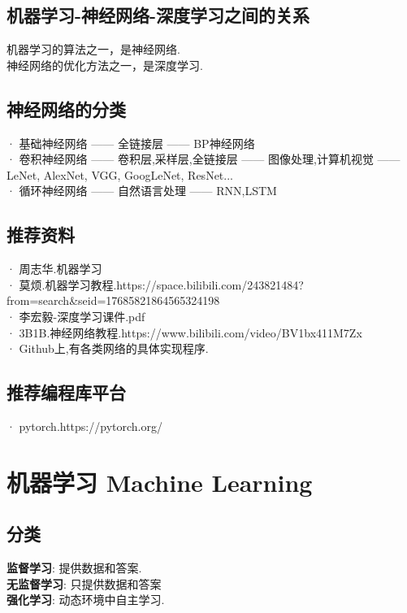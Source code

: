 \documentclass{article}
\begin{document}
\subsection{机器学习-神经网络-深度学习之间的关系}
机器学习的算法之一，是神经网络.\\
神经网络的优化方法之一，是深度学习.

\subsection{神经网络的分类}
· 基础神经网络 —— 全链接层 —— BP神经网络\\
· 卷积神经网络 —— 卷积层,采样层,全链接层 —— 图像处理,计算机视觉  —— LeNet, AlexNet, VGG, GoogLeNet, ResNet...\\
· 循环神经网络 —— 自然语言处理 —— RNN,LSTM\\

\subsection{推荐资料}
· 周志华.机器学习\\
· 莫烦.机器学习教程.https://space.bilibili.com/243821484?from=search&seid=17685821864565324198\\
· 李宏毅-深度学习课件.pdf\\
· 3B1B.神经网络教程.https://www.bilibili.com/video/BV1bx411M7Zx \\
· Github上,有各类网络的具体实现程序.

\subsection{推荐编程库平台}
· pytorch.https://pytorch.org/


\newpage
\section{机器学习 Machine Learning}
\subsection{分类}
\textbf{监督学习}: 提供数据和答案.\\
\textbf{无监督学习}: 只提供数据和答案\\
\textbf{强化学习}: 动态环境中自主学习.
\end{document}
